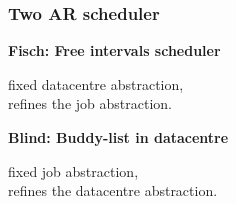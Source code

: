 \documentclass{beamer}
\newcommand{\fisch}{\textsf{Fisch}\xspace}
\newcommand{\blind}{\textsf{Blind}\xspace}
\begin{document}
\begin{frame}
  \frametitle{Two AR scheduler}
  
  {\large\bf
  \fisch: Free intervals scheduler
  }

  \vspace{10pt}

  fixed datacentre abstraction,\\
  refines the job abstraction.

  \vspace{2cm}

  {\large\bf
  \blind: Buddy-list in datacentre
  }

  \vspace{10pt}

  fixed job abstraction,\\
  refines the datacentre abstraction.

\end{frame}
\end{document}
